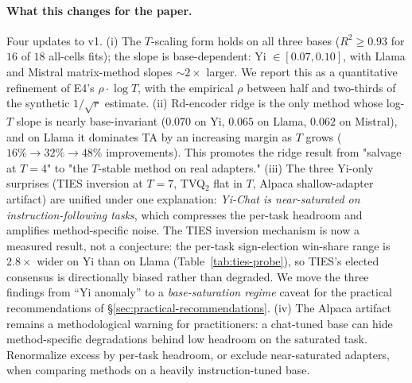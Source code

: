 \paragraph{What this changes for the paper.}
Four updates to v1.
(i) The $T$-scaling form holds on all three bases ($R^2 \geq 0.93$ for
$16$ of $18$ all-cells fits); the slope is base-dependent: Yi
$\in [0.07, 0.10]$, with Llama and Mistral matrix-method slopes
$\sim 2\times$ larger. We report this as a
quantitative refinement of E4's $\rho \cdot \log T$, with the
empirical $\rho$ between half and two-thirds of the synthetic
$1 / \sqrt{r}$ estimate.
(ii) Rd-encoder ridge is the only method whose log-$T$ slope is
nearly base-invariant ($0.070$ on Yi, $0.065$ on Llama, $0.062$ on
Mistral), and on
Llama it dominates TA by an increasing margin as $T$ grows
($16\% \to 32\% \to 48\%$ improvements). This promotes the ridge
result from "salvage at $T = 4$" to "the $T$-stable method on
real adapters."
(iii) The three Yi-only surprises (TIES inversion at $T = 7$,
TVQ$_2$ flat in $T$, Alpaca shallow-adapter artifact) are unified
under one explanation: \emph{Yi-Chat is near-saturated on
instruction-following tasks}, which compresses the per-task
headroom and amplifies method-specific noise. The TIES inversion
mechanism is now a measured result, not a conjecture: the per-task
sign-election win-share range is $2.8 \times$ wider on Yi than on
Llama (Table~\ref{tab:ties-probe}), so TIES's elected consensus is
directionally biased rather than degraded. We move the three
findings from ``Yi anomaly'' to a \emph{base-saturation regime}
caveat for the practical recommendations of
\S\ref{sec:practical-recommendations}.
(iv) The Alpaca artifact remains a methodological warning for
practitioners: a chat-tuned base can hide method-specific
degradations behind low headroom on the saturated task. Renormalize
excess by per-task headroom, or exclude near-saturated adapters,
when comparing methods on a heavily instruction-tuned base.

